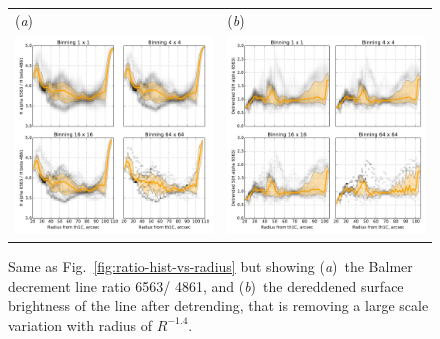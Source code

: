 \documentclass[preprint]{aastex}
\begin{document}
\begin{figure}[p]
  \begin{tabular}{ll}
    (\textit{a}) & (\textit{b}) \\
    \includegraphics{rha-hb-vs-radius-binning-new} &
    \includegraphics{sha-vs-radius-binning-new} \\
  \end{tabular}
  \caption{Same as Fig.~\ref{fig:ratio-hist-vs-radius} but showing
    (\textit{a})~the Balmer decrement line ratio \ha{} 6563/\hb{}
    4861, and (\textit{b})~the dereddened surface brightness of the
    \ha{} line after detrending, that is removing a large scale
    variation with radius of \(R^{-1.4}\).}
  \label{fig:sha-hist-vs-radius}
\end{figure}
\end{document}
